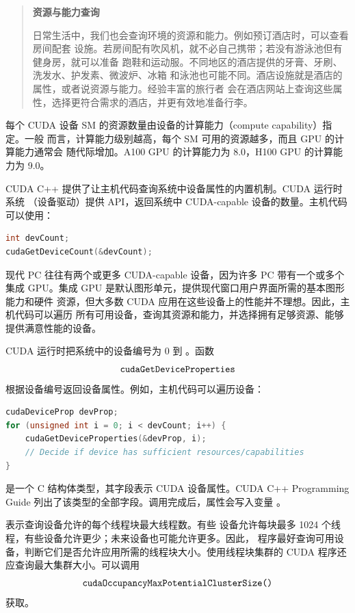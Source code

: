 \begin{quote}
\textbf{资源与能力查询}

日常生活中，我们也会查询环境的资源和能力。例如预订酒店时，可以查看房间配套
设施。若房间配有吹风机，就不必自己携带；若没有游泳池但有健身房，就可以准备
跑鞋和运动服。不同地区的酒店提供的牙膏、牙刷、洗发水、护发素、微波炉、冰箱
和泳池也可能不同。酒店设施就是酒店的属性，或者说资源与能力。经验丰富的旅行者
会在酒店网站上查询这些属性，选择更符合需求的酒店，并更有效地准备行李。
\end{quote}

每个 CUDA 设备 SM 的资源数量由设备的计算能力（compute capability）指定。一般
而言，计算能力级别越高，每个 SM 可用的资源越多，而且 GPU 的计算能力通常会
随代际增加。A100 GPU 的计算能力为 8.0，H100 GPU 的计算能力为 9.0。

CUDA C++ 提供了让主机代码查询系统中设备属性的内置机制。CUDA 运行时系统
（设备驱动）提供  API，返回系统中 CUDA-capable
设备的数量。主机代码可以使用：

\begin{lstlisting}[language=C++,firstnumber=1]
int devCount;
cudaGetDeviceCount(&devCount);
\end{lstlisting}

现代 PC 往往有两个或更多 CUDA-capable 设备，因为许多 PC 带有一个或多个集成
GPU。集成 GPU 是默认图形单元，提供现代窗口用户界面所需的基本图形能力和硬件
资源，但大多数 CUDA 应用在这些设备上的性能并不理想。因此，主机代码可以遍历
所有可用设备，查询其资源和能力，并选择拥有足够资源、能够提供满意性能的设备。

CUDA 运行时把系统中的设备编号为 0 到 。函数
\[
\code{cudaGetDeviceProperties}
\]
根据设备编号返回设备属性。例如，主机代码可以遍历设备：

\begin{lstlisting}[language=C++,firstnumber=1]
cudaDeviceProp devProp;
for (unsigned int i = 0; i < devCount; i++) {
    cudaGetDeviceProperties(&devProp, i);
    // Decide if device has sufficient resources/capabilities
}
\end{lstlisting}

 是一个 C 结构体类型，其字段表示 CUDA 设备属性。CUDA C++
Programming Guide 列出了该类型的全部字段。调用完成后，属性会写入变量
。

 表示查询设备允许的每个线程块最大线程数。有些
设备允许每块最多 1024 个线程，有些设备允许更少；未来设备也可能允许更多。因此，
程序最好查询可用设备，判断它们是否允许应用所需的线程块大小。使用线程块集群的
CUDA 程序还应查询最大集群大小。可以调用
\[
\code{cudaOccupancyMaxPotentialClusterSize()}
\]
获取。

